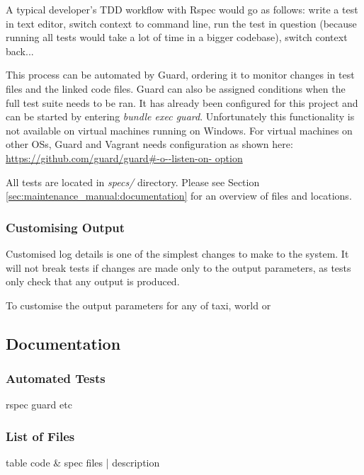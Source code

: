 A typical developer's TDD workflow with Rspec would go as follows: write a test
in text editor, switch context to command line, run the test in question
(because running all tests would take a lot of time in a bigger codebase),
switch context back...

This process can be automated by Guard, ordering it to monitor changes in test
files and the linked code files. Guard can also be assigned conditions when the
full test suite needs to be ran. It has already been configured for this
project and can be started by entering \textit{bundle exec guard}.
Unfortunately this functionality is not available on virtual machines running
on Windows. For virtual machines on other OSs, Guard and Vagrant needs
configuration as shown here: \url{https://github.com/guard/guard#-o--listen-on-
option}

All tests are located in \textit{specs/} directory. Please see Section
\ref{sec:maintenance_manual:documentation} for an overview of files and
locations.


\subsubsection{Customising Output}
\label{sec:maintenance_manual:customising_output}

Customised log details is one of the simplest changes to make to the system. It
will not break tests if changes are made only to the output parameters, as
tests only check that any output is produced.

To customise the output parameters for any of taxi, world or 





\subsection{Documentation}

\subsubsection{Automated Tests}
 rspec guard etc

\subsubsection{List of Files}

table
code \& spec files | description
